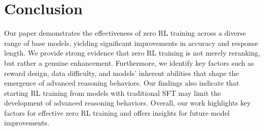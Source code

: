 \documentclass{article} %
\begin{document}
\section{Conclusion}
Our paper demonstrates the effectiveness of zero RL training across a diverse range of base models, yielding significant improvements in accuracy and response length. We provide strong evidence that zero RL training is not merely reranking, but rather a genuine enhancement. Furthermore, we identify key factors such as reward design, data difficulty, and models' inherent abilities that shape the emergence of advanced reasoning behaviors. Our findings also indicate that starting RL training from models with traditional SFT may limit the development of advanced reasoning behaviors. Overall, our work highlights key factors for effective zero RL training and offers insights for future model improvements.








\newpage

\end{document}

